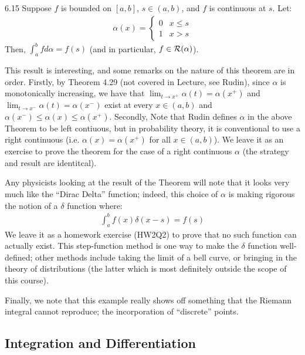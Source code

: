 \setcounter{rudin}{14}

\begin{theorem}{}{6.15}
    Suppose $f$ is bounded on $[a, b]$, $s \in (a, b)$, and $f$ is continuous at $s$. Let:
    \begin{align*}
        \alpha(x) = \begin{cases}
            0 & x \leq s
            \\ 1 & x > s
        \end{cases}
    \end{align*}
    Then, $\int_a^b fd\alpha = f(s)$ (and in particular, $f \in \mathcal{R}(\alpha)$).
\end{theorem}

\noindent This result is interesting, and some remarks on the nature of this theorem are in order. Firstly, by Theorem 4.29 (not covered in Lecture, see Rudin), since $\alpha$ is monotonically increasing, we have that $\lim_{t \rightarrow x^+}\alpha(t) = \alpha(x^+)$ and $\lim_{t \rightarrow x^-}\alpha(t) = \alpha(x^-)$ exist at every $x \in (a, b)$ and $\alpha(x^-) \leq \alpha(x) \leq \alpha(x^+)$. Secondly, Note that Rudin defines $\alpha$ in the above Theorem to be left contiuous, but in probability theory, it is conventional to use a right continuous (i.e. $\alpha(x) = \alpha(x^+)$ for all $x \in (a, b)$). We leave it as an exercise to prove the theorem for the case of a right continuous $\alpha$ (the strategy and result are identitcal).

Any physicists looking at the result of the Theorem will note that it looks very much like the ``Dirac Delta'' function; indeed, this choice of $\alpha$ is making rigorous the notion of a $\delta$ function where:
\begin{align*}
    \int_a^b f(x)\delta(x - s) = f(s)
\end{align*}
We leave it as a homework exercise (HW2Q2) to prove that no such function can actually exist. This step-function method is one way to make the $\delta$ function well-defined; other methods include taking the limit of a bell curve, or bringing in the theory of distributions (the latter which is most definitely outside the scope of this course).

Finally, we note that this example really shows off something that the Riemann integral cannot reproduce; the incorporation of ``discrete'' points.

\subsection{Integration and Differentiation}

